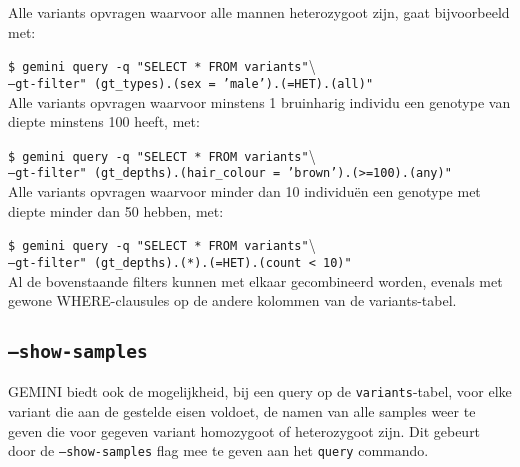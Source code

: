 \noindent Alle variants opvragen waarvoor alle mannen heterozygoot zijn, gaat bijvoorbeeld met:

\noindent\texttt{\$ gemini query -q "}\texttt{SELECT * FROM variants"}\textbackslash \\
\texttt{--gt-filter" }\texttt{(gt\_types).(sex = 'male').(=HET).(all)"}\\

\noindent Alle variants opvragen waarvoor minstens 1 bruinharig individu een genotype van diepte minstens 100 heeft, met:

\noindent\texttt{\$ gemini query -q "}\texttt{SELECT * FROM variants"}\textbackslash \\
\texttt{--gt-filter" }\texttt{(gt\_depths).(hair\_colour = 'brown').(>=100).(any)"}\\

\noindent Alle variants opvragen waarvoor minder dan 10 individu\"en een genotype met diepte minder dan 50 hebben, met:

\noindent\texttt{\$ gemini query -q "}\texttt{SELECT * FROM variants"}\textbackslash \\
\texttt{--gt-filter" }\texttt{(gt\_depths).(*).(=HET).(count < 10)"}\\

\noindent Al de bovenstaande filters kunnen met elkaar gecombineerd worden, evenals met gewone WHERE-clausules op de andere kolommen van de variants-tabel.

\subsection{\texttt{--show-samples}}

GEMINI biedt ook de mogelijkheid, bij een query op de \texttt{variants}-tabel, voor elke variant die aan de gestelde eisen voldoet, de namen van alle samples weer te geven die voor gegeven variant homozygoot of heterozygoot zijn. Dit gebeurt door de \texttt{--show-samples} flag mee te geven aan het \texttt{query} commando.



